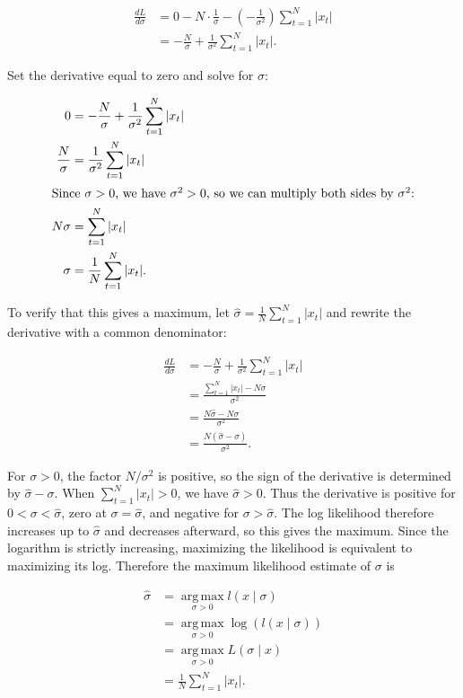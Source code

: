 \documentclass[12pt]{article}
\begin{document}
\begin{enumerate}
\[
\begin{aligned}
\frac{dL}{d\sigma}
&= 0 - N\cdot\frac{1}{\sigma}
   - \left(-\frac{1}{\sigma^2}\right)\sum_{t=1}^N |x_t| \\
&= -\frac{N}{\sigma} + \frac{1}{\sigma^2}\sum_{t=1}^N |x_t|.
\end{aligned}
\]

Set the derivative equal to zero and solve for $\sigma$:

\begin{align*}
0 &= -\frac{N}{\sigma} + \frac{1}{\sigma^2}\sum_{t=1}^N |x_t| \\
\frac{N}{\sigma} &= \frac{1}{\sigma^2}\sum_{t=1}^N |x_t| \\
\intertext{Since $\sigma > 0$, we have $\sigma^2 > 0$, so we can multiply both sides by $\sigma^2$:}
N\sigma &= \sum_{t=1}^N |x_t| \\
\sigma &= \frac{1}{N}\sum_{t=1}^N |x_t|.
\end{align*}

To verify that this gives a maximum, let $\hat{\sigma}=\frac{1}{N}\sum_{t=1}^N |x_t|$ and rewrite the derivative with a common denominator:

\[
\begin{aligned}
\frac{dL}{d\sigma}
&= -\frac{N}{\sigma} + \frac{1}{\sigma^2}\sum_{t=1}^N |x_t| \\
&= \frac{\sum_{t=1}^N |x_t|-N\sigma}{\sigma^2} \\
&= \frac{N\hat{\sigma}-N\sigma}{\sigma^2} \\
&= \frac{N(\hat{\sigma}-\sigma)}{\sigma^2}.
\end{aligned}
\]

For $\sigma>0$, the factor $N/\sigma^2$ is positive, so the sign of the derivative is determined by $\hat{\sigma}-\sigma$. When $\sum_{t=1}^N |x_t|>0$, we have $\hat{\sigma}>0$. Thus the derivative is positive for $0<\sigma<\hat{\sigma}$, zero at $\sigma=\hat{\sigma}$, and negative for $\sigma>\hat{\sigma}$. The log likelihood therefore increases up to $\hat{\sigma}$ and decreases afterward, so this gives the maximum. Since the logarithm is strictly increasing, maximizing the likelihood is equivalent to maximizing its log. Therefore the maximum likelihood estimate of $\sigma$ is

\[
\begin{aligned}
\hat{\sigma}
&= \operatorname*{arg\,max}_{\sigma > 0} l(x \mid \sigma) \\
&= \operatorname*{arg\,max}_{\sigma > 0} \log\left(l(x \mid \sigma)\right) \\
&= \operatorname*{arg\,max}_{\sigma > 0} L(\sigma \mid x) \\
&= \boxed{\frac{1}{N}\sum_{t=1}^N |x_t|}.
\end{aligned}
\]


\end{enumerate}
\end{document}
